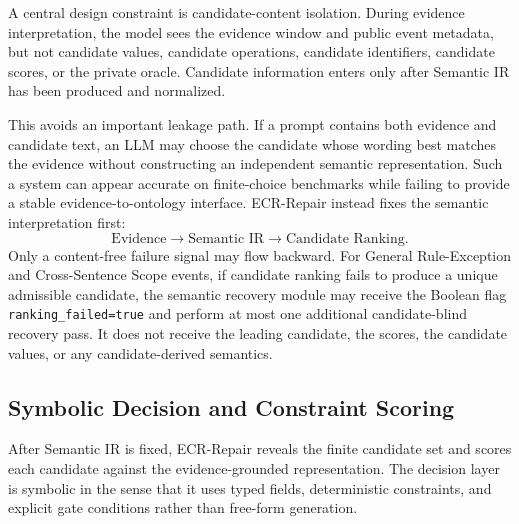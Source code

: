 \documentclass[conference]{IEEEtran}
\begin{document}
A central design constraint is candidate-content isolation. During evidence interpretation, the model sees the evidence window and public event metadata, but not candidate values, candidate operations, candidate identifiers, candidate scores, or the private oracle. Candidate information enters only after Semantic IR has been produced and normalized.

This avoids an important leakage path. If a prompt contains both evidence and candidate text, an LLM may choose the candidate whose wording best matches the evidence without constructing an independent semantic representation. Such a system can appear accurate on finite-choice benchmarks while failing to provide a stable evidence-to-ontology interface. ECR-Repair instead fixes the semantic interpretation first:
\[
\text{Evidence}
\rightarrow
\text{Semantic IR}
\rightarrow
\text{Candidate Ranking}.
\]
Only a content-free failure signal may flow backward. For General Rule-Exception and Cross-Sentence Scope events, if candidate ranking fails to produce a unique admissible candidate, the semantic recovery module may receive the Boolean flag \texttt{ranking\_failed=true} and perform at most one additional candidate-blind recovery pass. It does not receive the leading candidate, the scores, the candidate values, or any candidate-derived semantics.

\subsection{Symbolic Decision and Constraint Scoring}

After Semantic IR is fixed, ECR-Repair reveals the finite candidate set and scores each candidate against the evidence-grounded representation. The decision layer is symbolic in the sense that it uses typed fields, deterministic constraints, and explicit gate conditions rather than free-form generation.
\end{document}
